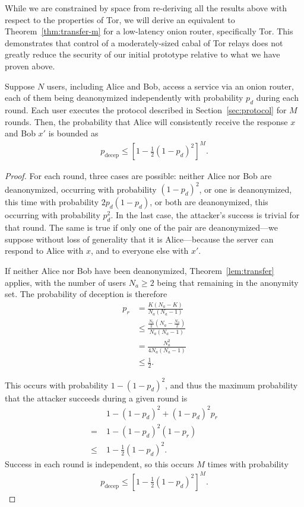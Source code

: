 \documentclass[USenglish]{llncs}
\begin{document}
While we are constrained by space from re-deriving
all the results above with respect to the properties of Tor,
we will derive an equivalent to Theorem~\ref{thm:transfer-m} for
a low-latency onion router, specifically Tor.  This demonstrates that control of a moderately-sized
cabal of Tor relays does not greatly reduce the security of our initial prototype
relative to what we have proven above.


\begin{theorem}\label{thm:transfer-m-onion}
Suppose $N$ users, including Alice and Bob, access a service via an onion router,
each of them being deanonymized independently with probability $p_d$ during each round.
Each user executes the protocol described in Section~\ref{sec:protocol} for $M$
rounds.  Then, the probability that Alice will consistently
receive the response $x$ and Bob $x'$ is bounded as
\begin{align}
	p_\mathrm{decep} \le \left[ 1 - \frac{1}{2}(1-p_d)^2 \right]^M.
\end{align}

\begin{proof}
For each round, three cases are possible: neither Alice nor Bob are
deanonymized, occurring with probability $(1-p_d)^2$, or one is
deanonymized, this time with probability $2p_d(1-p_d)$, or both are
deanonymized, this occurring with probability $p_d^2$. In the last case, the attacker's
success is trivial for that round.  The same is true if only one of the pair are
deanonymized---we suppose
without loss of generality that it is Alice---because the server can respond to Alice with
$x$, and to everyone else with $x'$.

If neither Alice nor Bob have been deanonymized, Theorem~\ref{lem:transfer}
applies, with the number of users $N_a \ge 2$ being that remaining in the anonymity set.  The
probability of deception is therefore
\begin{align}
p_r &= \frac{K(N_a-K)}{N_a(N_a - 1)} \\ &\le \frac{\frac{N_a}{2}\left(N_a-\frac{N_a}{2}\right)}{N_a(N_a - 1)} \\
	&= \frac{N_a^2}{4 N_a(N_a-1)}\\
	&\le \frac{1}{2} .
\end{align}

This occurs with probability $1-(1-p_d)^2$, and thus the maximum probability that
the attacker succeeds during a given round is 
\begin{align}
	&1-(1-p_d)^2 + (1-p_d)^2  p_r \\ =\; &1 -(1-p_d)^2 (1-p_r) \nonumber \\
		\le \; &1 - \frac{1}{2}(1-p_d)^2.
\end{align}
Success in each round is independent, so this occurs $M$ times with
probability
\begin{align}
	p_\mathrm{decep} \le \left[ 1 - \frac{1}{2}(1-p_d)^2 \right]^M.
\end{align}

\end{proof}
\end{theorem}
\end{document}

